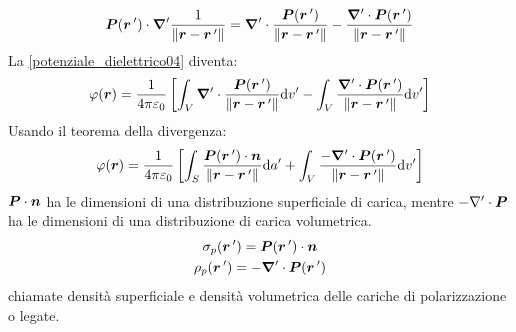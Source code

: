 \begin{equation}
  \boldsymbol{P}(\boldsymbol{r}\,')\cdot\boldsymbol{\nabla}'\frac{1}{\left\lVert\boldsymbol{r}-\boldsymbol{r}\,'\right\rVert}=\boldsymbol{\nabla}'\cdot\frac{\boldsymbol{P}(\boldsymbol{r}\,')}{\left\lVert\boldsymbol{r}-\boldsymbol{r}\,'\right\rVert}-\frac{\boldsymbol{\nabla}'\cdot\boldsymbol{P}(\boldsymbol{r}\,')}{\left\lVert\boldsymbol{r}-\boldsymbol{r}\,'\right\rVert}
\end{equation}
La \eqref{potenziale_dielettrico04} diventa:
\begin{equation}
  \varphi(\boldsymbol{r})=\frac{1}{4\pi\varepsilon_0}\left[\int_V\boldsymbol{\nabla}'\cdot\frac{\boldsymbol{P}(\boldsymbol{r}\,')}{\left\lVert\boldsymbol{r}-\boldsymbol{r}\,'\right\rVert}\mathrm{d} v'-\int_V\frac{\boldsymbol{\nabla}'\cdot\boldsymbol{P}(\boldsymbol{r}\,')}{\left\lVert\boldsymbol{r}-\boldsymbol{r}\,'\right\rVert}\mathrm{d} v'\right]
\end{equation}
Usando il teorema della divergenza:
\begin{equation}
  \varphi(\boldsymbol{r})=\frac{1}{4\pi\varepsilon_0}\left[\int_S\frac{\boldsymbol{P}(\boldsymbol{r}\,')\cdot \boldsymbol{n}}{\left\lVert\boldsymbol{r}-\boldsymbol{r}\,'\right\rVert}\mathrm{d} a'+\int_V\frac{-\boldsymbol{\nabla}'\cdot\boldsymbol{P}(\boldsymbol{r}\,')}{\left\lVert\boldsymbol{r}-\boldsymbol{r}\,'\right\rVert}\mathrm{d} v'\right]
\end{equation}
$\boldsymbol{P}\cdot\boldsymbol{n}$ ha le dimensioni di una distribuzione superficiale di carica, mentre $-\nabla'\cdot\boldsymbol{P}$ ha le dimensioni di una distribuzione di carica volumetrica.
\begin{subequations}
  \begin{gather}
    \sigma_p(\boldsymbol{r}\,')=\boldsymbol{P}(\boldsymbol{r}\,')\cdot \boldsymbol{n}\\
    \rho_p(\boldsymbol{r}\,')=-\boldsymbol{\nabla}'\cdot\boldsymbol{P}(\boldsymbol{r}\,')
  \end{gather}
\end{subequations}
chiamate densità superficiale e densità volumetrica delle cariche di polarizzazione o legate.

